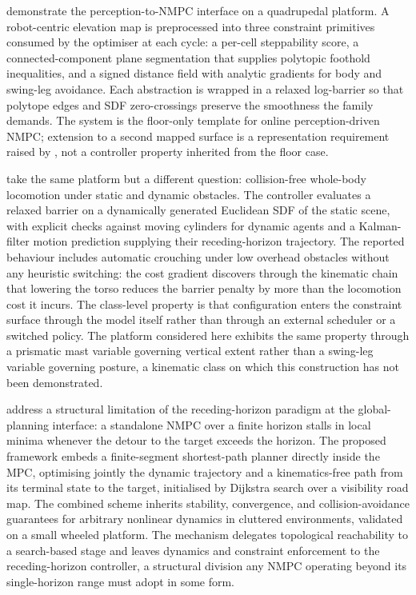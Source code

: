 \documentclass[11pt,a4paper]{article}
\begin{document}
\citet{grandiaPerceptiveLocomotionNonlinear2022} demonstrate the perception-to-NMPC interface on a quadrupedal platform. A robot-centric elevation map is preprocessed into three constraint primitives consumed by the optimiser at each cycle: a per-cell steppability score, a connected-component plane segmentation that supplies polytopic foothold inequalities, and a signed distance field with analytic gradients for body and swing-leg avoidance. Each abstraction is wrapped in a relaxed log-barrier so that polytope edges and SDF zero-crossings preserve the smoothness the family demands. The system is the floor-only template for online perception-driven NMPC; extension to a second mapped surface is a representation requirement raised by , not a controller property inherited from the floor case.

\citet{gaertnerCollisionFreeMPCLegged2021} take the same platform but a different question: collision-free whole-body locomotion under static and dynamic obstacles. The controller evaluates a relaxed barrier on a dynamically generated Euclidean SDF of the static scene, with explicit checks against moving cylinders for dynamic agents and a Kalman-filter motion prediction supplying their receding-horizon trajectory. The reported behaviour includes automatic crouching under low overhead obstacles without any heuristic switching: the cost gradient discovers through the kinematic chain that lowering the torso reduces the barrier penalty by more than the locomotion cost it incurs. The class-level property is that configuration enters the constraint surface through the model itself rather than through an external scheduler or a switched policy. The platform considered here exhibits the same property through a prismatic mast variable governing vertical extent rather than a swing-leg variable governing posture, a kinematic class on which this construction has not been demonstrated.

\citet{kohlerMPCFrameworkEfficient2025} address a structural limitation of the receding-horizon paradigm at the global-planning interface: a standalone NMPC over a finite horizon stalls in local minima whenever the detour to the target exceeds the horizon. The proposed framework embeds a finite-segment shortest-path planner directly inside the MPC, optimising jointly the dynamic trajectory and a kinematics-free path from its terminal state to the target, initialised by Dijkstra search over a visibility road map. The combined scheme inherits stability, convergence, and collision-avoidance guarantees for arbitrary nonlinear dynamics in cluttered environments, validated on a small wheeled platform. The mechanism delegates topological reachability to a search-based stage and leaves dynamics and constraint enforcement to the receding-horizon controller, a structural division any NMPC operating beyond its single-horizon range must adopt in some form.
\end{document}
